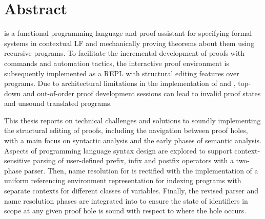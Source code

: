 \chapter*{Abstract}

\Beluga is a functional programming language and proof assistant for specifying formal systems in contextual \acs{LF} and mechanically proving theorems about them using recursive programs.
To facilitate the incremental development of proofs with commands and automation tactics, the \Harpoon interactive proof environment is subsequently implemented as a \acs{REPL} with structural editing features over \Beluga programs.
Due to architectural limitations in the implementation of \Beluga and \Harpoon, top-down and out-of-order proof development sessions can lead to invalid proof states and unsound translated programs.

This thesis reports on technical challenges and solutions to soundly implementing the structural editing of proofs, including the navigation between proof holes, with a main focus on syntactic analysis and the early phases of semantic analysis.
Aspects of programming language syntax design are explored to support context-sensitive parsing of user-defined prefix, infix and postfix operators with a two-phase parser.
Then, name resolution for \Beluga is rectified with the implementation of a uniform referencing environment representation for indexing programs with separate contexts for different classes of variables.
Finally, the revised parser and name resolution phases are integrated into \Harpoon to ensure the state of identifiers in scope at any given proof hole is sound with respect to where the hole occurs.
